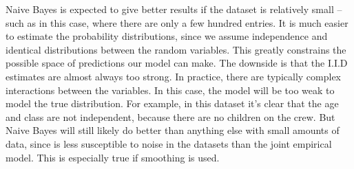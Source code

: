 \documentclass[letterpaper, 10pt]{article}
\begin{document}
Naive Bayes is expected to give better results if the dataset is relatively small -- such as in this case, where there are only a few hundred entries. It is much easier to estimate the probability distributions, since we assume independence and identical distributions between the random variables. This greatly constrains the possible space of predictions our model can make. The downside is that the I.I.D estimates are almost always too strong. In practice, there are typically complex interactions between the variables. In this case, the model will be too weak to model the true distribution. For example, in this dataset it's clear that the age and class are not independent, because there are no children on the crew. But Naive Bayes will still likely do better than anything else with small amounts of data, since is less susceptible to noise in the datasets than the joint empirical model. This is especially true if smoothing is used.
\end{document}
